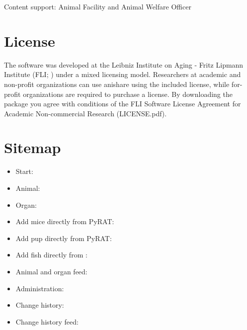 \documentclass[letterpaper,10pt,openany,oneside,english]{sphinxmanual}
\begin{document}
Content support: Animal Facility and Animal Welfare Officer


\chapter{License}
\label{\detokenize{index:license}}
The software was developed at the Leibniz Institute on Aging - Fritz Lipmann Institute (FLI; ) under a mixed licensing model.
Researchers at academic and non-profit organizations can use anishare using the included license, while for-profit organizations are required to purchase a license.
By downloading the package you agree with conditions of the FLI Software License Agreement for Academic Non-commercial Research (LICENSE.pdf).


\chapter{Sitemap}
\label{\detokenize{index:sitemap}}\begin{itemize}
\item {} 
Start: 

\item {} 
Animal: 

\item {} 
Organ: 

\item {} 
Add mice directly from PyRAT: 

\item {} 
Add pup directly from PyRAT: 

\item {} 
Add fish directly from : 

\item {} 
Animal and organ feed: 

\item {} 
Administration: 

\item {} 
Change history: 

\item {} 
Change history feed: 

\end{itemize}
\end{document}
